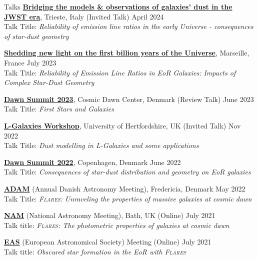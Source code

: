 \documentclass[a4paper,10pt]{resume} %
\begin{document}
\begin{rSection}{Talks}
	{\textbf{\href{https://darkdonevski.wixsite.com/dustfocusweek}{Bridging the models \& observations of galaxies' dust in the JWST era}}, Trieste, Italy (Invited Talk)} \hfill {April 2024}
	\\
	Talk Title: \textit{Reliability of emission line ratios in the early Universe - consequences of star-dust geometry}
	
	{\textbf{\href{https://geco2023-1gyr.sciencesconf.org/resource/page/id/2}{Shedding new light on the first billion years of the Universe}}, Marseille, France} \hfill {July 2023}
	\\
	Talk Title: \textit{Reliability of Emission Line Ratios in EoR Galaxies: Impacts of Complex Star-Dust Geometry}
	
	{\textbf{\href{https://cosmicdawn.dk/meetings-and-workshops/dawn-summit-2023/}{Dawn Summit 2023}}, Cosmic Dawn Center, Denmark (Review Talk)} \hfill {June 2023}
	\\
	Talk Title: \textit{First Stars and Galaxies}	
	
	{\textbf{\href{https://lgalaxiespublicrelease.github.io/workshop2022.html}{L-Galaxies Workshop}}, University of Hertfordshire, UK (Invited Talk)} \hfill {Nov 2022}
	\\
	Talk Title: \textit{Dust modelling in L-Galaxies and some applications}	
	
	{\textbf{\href{https://cosmicdawn.dk/meetings-and-workshops/dawn-summit-2022/}{Dawn Summit 2022}}, Copenhagen, Denmark} \hfill {June 2022}
	\\
	Talk Title: \textit{Consequences of star-dust distribution and geometry on EoR galaxies}
	
	{\textbf{\href{https://events.au.dk/adam2022}{ADAM}} (Annual Danish Astronomy Meeting), Fredericia, Denmark} \hfill {May 2022}
	\\
	{Talk Title: \textit{\textsc{Flares}: Unraveling the properties of massive galaxies at cosmic dawn}}
	
	{\textbf{\href{https://nam2021.org/}{NAM}} (National Astronomy Meeting), Bath, UK (Online)} \hfill {July 2021}
	\\
	Talk title: \textit{\textsc{Flares}: The photometric properties of galaxies at cosmic dawn}
	
	{\textbf{\href{https://eas.unige.ch//EAS2021/about.jsp}{EAS}} (European Astronomical Society) Meeting (Online)} \hfill {July 2021}
	\\
	Talk title: \textit{Obscured star formation in the EoR with \textsc{Flares}}
	

\end{rSection}
\end{document}
